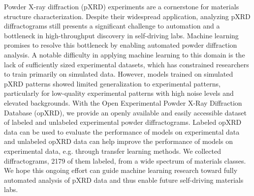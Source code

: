 Powder X-ray diffraction (pXRD) experiments are a cornerstone for materials structure characterization.
Despite their widespread application, analyzing pXRD diffractograms still presents a significant challenge to automation and a bottleneck in high-throughput discovery in self-driving labs.
Machine learning promises to resolve this bottleneck by enabling automated powder diffraction analysis.
A notable difficulty in applying machine learning to this domain is the lack of sufficiently sized experimental datasets, which has constrained researchers to train primarily on simulated data. However, models trained on simulated pXRD patterns showed limited generalization to experimental patterns, particularly for low-quality experimental patterns with high noise levels and elevated backgrounds.
With the Open Experimental Powder X-Ray Diffraction Database (opXRD), we provide an openly available and easily accessible dataset of labeled and unlabeled experimental powder diffractograms.
Labeled opXRD data can be used to evaluate the performance of models on experimental data and unlabeled opXRD data can help improve the performance of models on experimental data, e.g. through transfer learning methods.
We collected \numpatterns diffractograms, 2179 of them labeled, from a wide spectrum of materials classes.
We hope this ongoing effort can guide machine learning research toward fully automated analysis of pXRD data and thus enable future self-driving materials labs.